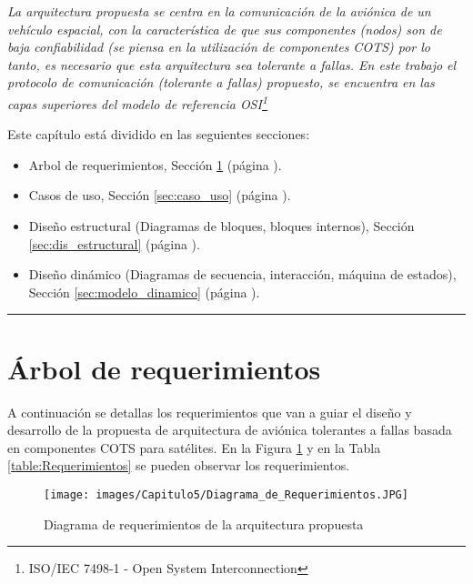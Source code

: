 \vspace{1cm}
\itshape
La arquitectura propuesta se centra en la comunicación de la aviónica de un
vehículo espacial, con la característica de que sus componentes (nodos) son
de baja confiabilidad (se piensa en la utilización de componentes COTS)
por lo tanto, es necesario que esta arquitectura sea tolerante a fallas. En este
trabajo el protocolo de comunicación (tolerante a fallas) propuesto,
se encuentra en las capas superiores del modelo de referencia OSI\footnote{ISO/IEC 7498-1 - Open System Interconnection}

Este capítulo está dividido en las seguientes secciones:

\begin{itemize}
\item Arbol de requerimientos, Sección \ref{sec:arbol_req} (página \pageref{sec:arbol_req}).
\item Casos de uso, Sección \ref{sec:caso_uso} (página \pageref{sec:caso_uso}).
\item Diseño estructural (Diagramas de bloques, bloques internos), Sección \ref{sec:dis_estructural}
(página \pageref{sec:dis_estructural}).
\item Diseño dinámico (Diagramas de secuencia, interacción, máquina de estados), Sección
\ref{sec:modelo_dinamico} (página \pageref{sec:modelo_dinamico}).
  
\end{itemize}
\upshape

\noindent\rule{\textwidth}{2pt}

\vspace{1cm}

\section{Árbol de requerimientos}\label{sec:arbol_req}
A continuación se detallas los requerimientos que van a guiar el diseño y
desarrollo de la propuesta de arquitectura de aviónica tolerantes a fallas
basada en componentes \ac{COTS} para satélites. En la Figura
\ref{fig:DiagramaRequerimientos} y en la Tabla \ref{table:Requerimientos} se pueden
observar los requerimientos. 

\begin{figure}[h!]
 \centering
 \texttt{[image: images/Capitulo5/Diagrama\_de\_Requerimientos.JPG]}
  \caption{Diagrama de requerimientos de la arquitectura propuesta}
\label{fig:DiagramaRequerimientos}
\end{figure} 

